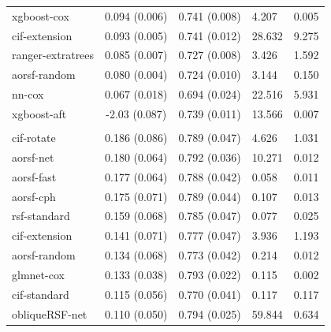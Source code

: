 \documentclass[twoside,11pt]{article}\usepackage[]{graphicx}\usepackage[]{xcolor}
\newenvironment{knitrout}{}{} %
\begin{document}
\begin{knitrout}
\begin{longtable}[t]{lcclc}
\hspace{1em}xgboost-cox & 0.094 (0.006) & 0.741 (0.008) & 4.207 & 0.005\\
\hspace{1em}cif-extension & 0.093 (0.005) & 0.741 (0.012) & 28.632 & 9.275\\
\hspace{1em}ranger-extratrees & 0.085 (0.007) & 0.727 (0.008) & 3.426 & 1.592\\
\hspace{1em}aorsf-random & 0.080 (0.004) & 0.724 (0.010) & 3.144 & 0.150\\
\hspace{1em}nn-cox & 0.067 (0.018) & 0.694 (0.024) & 22.516 & 5.931\\
\hspace{1em}xgboost-aft & -2.03 (0.087) & 0.739 (0.011) & 13.566 & 0.007\\
\addlinespace[0.3em]
\hline
\multicolumn{5}{l}{\textit{\textbf{VA lung cancer trial; death, n = 137, p = 8}}}\\
\hline
\hspace{1em}cif-rotate & 0.186 (0.086) & 0.789 (0.047) & 4.626 & 1.031\\
\hspace{1em}aorsf-net & 0.180 (0.064) & 0.792 (0.036) & 10.271 & 0.012\\
\hspace{1em}aorsf-fast & 0.177 (0.064) & 0.788 (0.042) & 0.058 & 0.011\\
\hspace{1em}aorsf-cph & 0.175 (0.071) & 0.789 (0.044) & 0.107 & 0.013\\
\hspace{1em}rsf-standard & 0.159 (0.068) & 0.785 (0.047) & 0.077 & 0.025\\
\hspace{1em}cif-extension & 0.141 (0.071) & 0.777 (0.047) & 3.936 & 1.193\\
\hspace{1em}aorsf-random & 0.134 (0.068) & 0.773 (0.042) & 0.214 & 0.012\\
\hspace{1em}glmnet-cox & 0.133 (0.038) & 0.793 (0.022) & 0.115 & 0.002\\
\hspace{1em}cif-standard & 0.115 (0.056) & 0.770 (0.041) & 0.117 & 0.117\\
\hspace{1em}obliqueRSF-net & 0.110 (0.050) & 0.794 (0.025) & 59.844 & 0.634\\

\end{longtable}
\end{knitrout}
\end{document}
